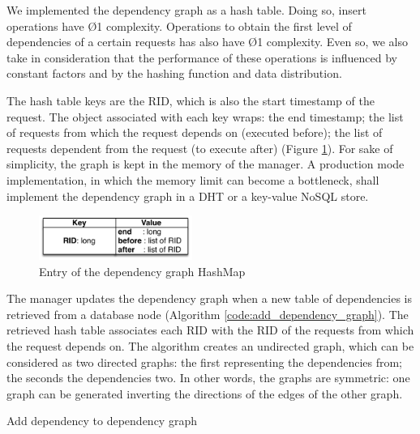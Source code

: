 We implemented the dependency graph as a hash table. Doing so, insert operations have \O{1} complexity. Operations to obtain the first level of dependencies of a certain requests has also have \O{1} complexity. Even so, we also take in consideration that the performance of these operations is influenced by constant factors and by the hashing function and data distribution.

The hash table keys are the \acf{RID}, which is also the start timestamp of the request. The object associated with each key wraps: the end timestamp; the list of requests from which the request depends on (executed before); the list of requests dependent from the request (to execute after) (Figure \ref{fig:impl:manager:graph}). For sake of simplicity, the graph is kept in the memory of the manager. A production mode implementation, in which the memory limit can become a bottleneck, shall implement the dependency graph in a \acf{DHT} or a key-value \acs{NoSQL} store.


\begin{figure}
  \centering
  \includegraphics[width=50mm]{arch/managerGraph}
  \caption{Entry of the dependency graph HashMap}
  \label{fig:impl:manager:graph}
\end{figure}


The manager updates the dependency graph when a new table of dependencies is retrieved from a database node (Algorithm \ref{code:add_dependency_graph}). The retrieved hash table associates each \acf{RID} with the \ac{RID} of the requests from which the request depends on. The algorithm creates an undirected graph, which can be considered as two directed graphs: the first representing the dependencies from; the seconds the dependencies two. In other words, the graphs are symmetric: one graph can be generated inverting the directions of the edges of the other graph.\\

 \begin{algorithm}[H]
 \DontPrintSemicolon{}
 	\;
 	\BlankLine
 	\caption{Add dependency to dependency graph}
	\label{code:add_dependency_graph}
\end{algorithm}

